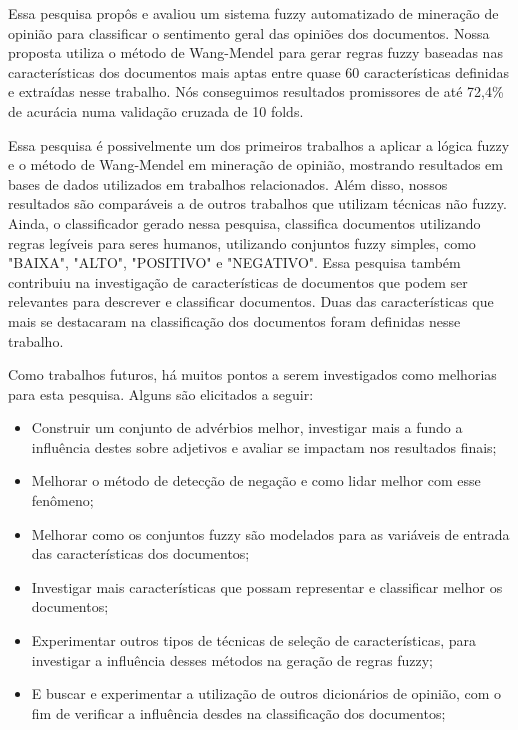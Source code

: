 \documentclass[template.tex]{subfiles}
\begin{document}

Essa pesquisa propôs e avaliou um sistema fuzzy automatizado de mineração de opinião para classificar o sentimento geral das opiniões dos documentos. Nossa proposta utiliza o método de Wang-Mendel \cite{wang1992generating} para gerar regras fuzzy baseadas nas características dos documentos mais aptas entre quase 60 características definidas e extraídas nesse trabalho. Nós conseguimos resultados promissores de até 72,4\% de acurácia numa validação cruzada de 10 folds.

Essa pesquisa é possivelmente um dos primeiros trabalhos a aplicar a lógica fuzzy e o método de Wang-Mendel em mineração de opinião, mostrando resultados em bases de dados utilizados em trabalhos relacionados. Além disso, nossos resultados são comparáveis a de outros trabalhos que utilizam técnicas não fuzzy. Ainda, o classificador gerado nessa pesquisa, classifica documentos utilizando regras legíveis para seres humanos, utilizando conjuntos fuzzy simples, como "BAIXA", "ALTO", "POSITIVO" e "NEGATIVO". Essa pesquisa também contribuiu na investigação de características de documentos que podem ser relevantes para descrever e classificar documentos. Duas das características que mais se destacaram na classificação dos documentos foram definidas nesse trabalho.

Como trabalhos futuros, há muitos pontos a serem investigados como melhorias para esta pesquisa. Alguns são elicitados a seguir:

\begin{itemize}
\item Construir um conjunto de advérbios melhor, investigar mais a fundo a influência destes sobre adjetivos e avaliar se impactam nos resultados finais;
\item Melhorar o método de detecção de negação e como lidar melhor com esse fenômeno;
\item Melhorar como os conjuntos fuzzy são modelados para as variáveis de entrada das características dos documentos;
\item Investigar mais características que possam representar e classificar melhor os documentos;
\item Experimentar outros tipos de técnicas de seleção de características, para investigar a influência desses métodos na geração de regras fuzzy;
\item E buscar e experimentar a utilização de outros dicionários de opinião, com o fim de verificar a influência desdes na classificação dos documentos;
\end{itemize}

\end{document}
